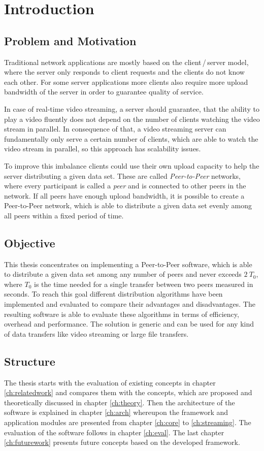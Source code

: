 \chapter{Introduction}
\section{Problem and Motivation}
Traditional network applications are mostly based on the client\,/\,server model, where the server only responds to client requests and the clients do not know each other. 
For some server applications more clients also require more upload bandwidth of the server in order to guarantee quality of service.

In case of real-time video streaming, a server should guarantee, that the ability to play a video fluently does not depend on the number of clients watching the video stream in parallel. In consequence of that, a video streaming server can fundamentally only serve a certain number of clients, which are able to watch the video stream in parallel, so this approach has scalability issues.

To improve this imbalance clients could use their own upload capacity to help the server distributing a given data set. These are called \emph{Peer-to-Peer} networks, where every participant is called a \emph{peer} and is connected to other peers in the network.  If all peers have enough upload bandwidth, it is possible to create a Peer-to-Peer network, which is able to distribute a given data set evenly among all peers within a fixed period of time.

\section{Objective}
This thesis concentrates on implementing a Peer-to-Peer software, which is able to distribute a given data set among any number of peers and never exceeds $2\:T_0$, where $T_0$ is the time needed for a single transfer between two peers measured in seconds. To reach this goal different distribution algorithms have been implemented and evaluated to compare their advantages and disadvantages. The resulting software is able to evaluate these algorithms in terms of efficiency, overhead and performance. The solution is generic and can be used for any kind of data transfers like video streaming or large file transfers.

\section{Structure}
The thesis starts with the evaluation of existing concepts in chapter \ref{ch:relatedwork} and compares them with the concepts, which are proposed and theoretically discussed in chapter \ref{ch:theory}. Then the architecture of the software is explained in chapter \ref{ch:arch} whereupon the framework and application modules are presented from chapter \ref{ch:core} to \ref{ch:streaming}. The evaluation of the software follows in chapter \ref{ch:eval}. The last chapter \ref{ch:futurework} presents future concepts based on the developed framework.
